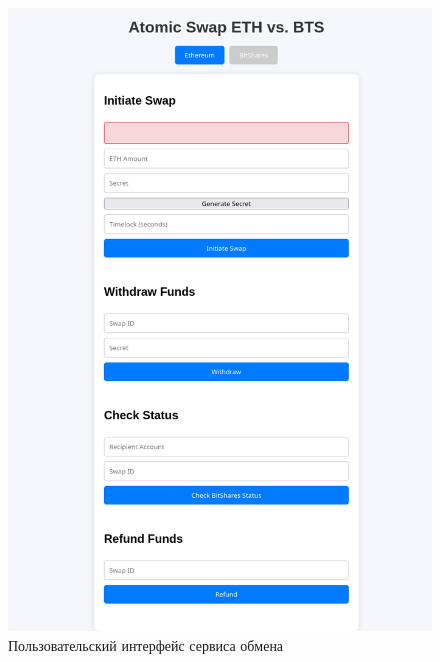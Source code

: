 \begin{figure}[H]
\centering
\includegraphics[scale=0.4]{res/ServiceInterface}
\caption{Пользовательский интерфейс сервиса обмена}
\label{pic:ServiceInterface}
\end{figure}

